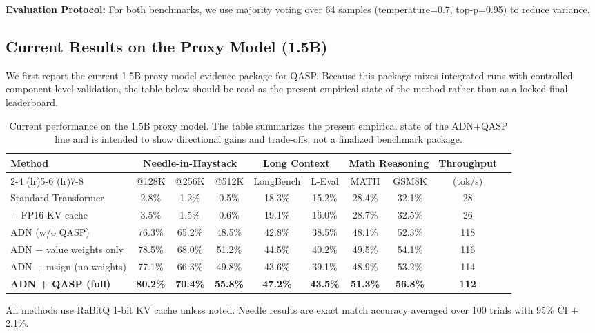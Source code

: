\documentclass[twocolumn]{article}
\begin{document}
\textbf{Evaluation Protocol:} For both benchmarks, we use majority voting over 64 samples (temperature=0.7, top-p=0.95) to reduce variance.

\subsection{Current Results on the Proxy Model (1.5B)}

We first report the current 1.5B proxy-model evidence package for QASP. Because this package mixes integrated runs with controlled component-level validation, the table below should be read as the present empirical state of the method rather than as a locked final leaderboard.

\begin{table}[htbp]
\centering
\caption{Current performance on the 1.5B proxy model. The table summarizes the present empirical state of the ADN+QASP line and is intended to show directional gains and trade-offs, not a finalized benchmark package.}
\label{tab:main-results}
\begin{threeparttable}
\begin{tabular}{lccccccccc}
\toprule
\multirow{2}{*}{\textbf{Method}} & \multicolumn{3}{c}{\textbf{Needle-in-Haystack}} & \multicolumn{2}{c}{\textbf{Long Context}} & \multicolumn{2}{c}{\textbf{Math Reasoning}} & \multirow{2}{*}{\textbf{Throughput}} \\
\cmidrule(lr){2-4} \cmidrule(lr){5-6} \cmidrule(lr){7-8}
& @128K & @256K & @512K & LongBench & L-Eval & MATH & GSM8K & (tok/s) \\
\midrule
Standard Transformer & 2.8\% & 1.2\% & 0.5\% & 18.3\% & 15.2\% & 28.4\% & 32.1\% & 28 \\
\quad + FP16 KV cache & 3.5\% & 1.5\% & 0.6\% & 19.1\% & 16.0\% & 28.7\% & 32.5\% & 26 \\
\midrule
ADN (w/o QASP) & 76.3\% & 65.2\% & 48.5\% & 42.8\% & 38.5\% & 48.1\% & 52.3\% & 118 \\
ADN + value weights only & 78.5\% & 68.0\% & 51.2\% & 44.5\% & 40.2\% & 49.5\% & 54.1\% & 116 \\
ADN + msign (no weights) & 77.1\% & 66.3\% & 49.8\% & 43.6\% & 39.1\% & 48.9\% & 53.2\% & 114 \\
\midrule
\textbf{ADN + QASP (full)} & \textbf{80.2\%} & \textbf{70.4\%} & \textbf{55.8\%} & \textbf{47.2\%} & \textbf{43.5\%} & \textbf{51.3\%} & \textbf{56.8\%} & \textbf{112} \\
\bottomrule
\end{tabular}
\begin{tablenotes}
\small
\item All methods use RaBitQ 1-bit KV cache unless noted. Needle results are exact match accuracy averaged over 100 trials with 95\% CI $\pm$2.1\%.
\end{tablenotes}
\end{threeparttable}
\end{table}
\end{document}
